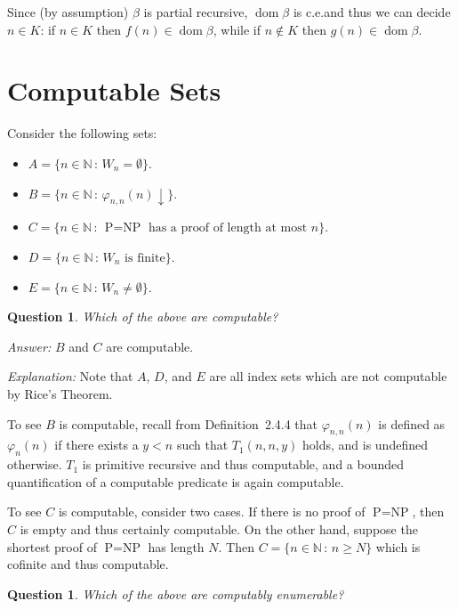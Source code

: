 \documentclass{article}
\newtheorem{question}[theorem]{Question}
\newcommand{\compr}[2]{\{ #1 \,:\, #2 \}}
\newcommand{\terminates}{\!\!\downarrow}
\DeclareMathOperator{\dom}{dom}
\begin{document}
  Since (by assumption) $\beta$ is partial recursive, $\dom \beta$ is c.e.\@ and thus we can decide $n \in K$: if $n \in
  K$ then $f(n) \in \dom \beta$, while if $n \not \in K$ then $g(n) \in \dom \beta$.

  \section{Computable Sets}

  Consider the following sets:
  \begin{itemize}
    \item $A = \compr{n \in \mathbb{N}}{W_n = \emptyset}$.
    \item $B = \compr{n \in \mathbb{N}}{\varphi_{n,n}(n)\terminates}$.
    \item $C = \compr{n \in \mathbb{N}}{\text{$\text{P} = \text{NP}$ has a proof of length at most $n$}}$.
    \item $D = \compr{n \in \mathbb{N}}{\text{$W_n$ is finite}}$.
    \item $E = \compr{n \in \mathbb{N}}{W_n \neq \emptyset}$.
  \end{itemize}

  \begin{question}
    Which of the above are computable?
  \end{question}

  \noindent\emph{Answer:} $B$ and $C$ are computable.

  \noindent\emph{Explanation:} Note that $A$, $D$, and $E$ are all index sets which are not computable by Rice's Theorem.

  To see $B$ is computable, recall from Definition~2.4.4 that $\varphi_{n,n}(n)$ is defined as $\varphi_n(n)$ if
  there exists a $y < n$ such that $T_1(n, n, y)$ holds, and is undefined otherwise.  $T_1$ is primitive recursive
  and thus computable, and a bounded quantification of a computable predicate is again computable.

  To see $C$ is computable, consider two cases.  If there is no proof of $\text{P} = \text{NP}$, then $C$ is empty and
  thus certainly computable.  On the other hand, suppose the shortest proof of $\text{P} = \text{NP}$ has length $N$.
  Then $C = \compr{n \in \mathbb{N}}{n \ge N}$ which is cofinite and thus computable.

  \begin{question}
    Which of the above are computably enumerable?
  \end{question}
\end{document}
